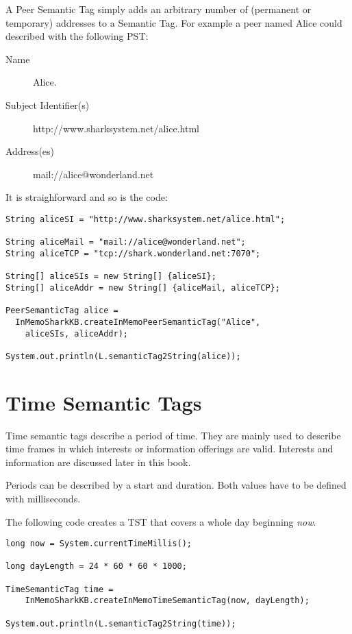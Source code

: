 A Peer Semantic Tag simply adds an arbitrary number of (permanent or temporary) addresses to a Semantic Tag. For example a peer named Alice could described with the following PST: 

\begin{description}
    \item[Name] Alice.
    \item[Subject Identifier(s)] http://www.sharksystem.net/alice.html
    \item[Address(es)] mail://alice@wonderland.net
\end{description}

It is straighforward and so is the code:

\begin{verbatim}
String aliceSI = "http://www.sharksystem.net/alice.html";

String aliceMail = "mail://alice@wonderland.net";
String aliceTCP = "tcp://shark.wonderland.net:7070";

String[] aliceSIs = new String[] {aliceSI};
String[] aliceAddr = new String[] {aliceMail, aliceTCP};

PeerSemanticTag alice = 
  InMemoSharkKB.createInMemoPeerSemanticTag("Alice", 
    aliceSIs, aliceAddr);

System.out.println(L.semanticTag2String(alice));
\end{verbatim}

\section{Time Semantic Tags}
Time semantic tags describe a period of time. They are mainly used to describe time frames in which interests or information offerings are valid. Interests and information are discussed later in this book.

Periods can be described by a start and duration. Both values have to be defined with milliseconds.

The following code creates a TST that covers a whole day beginning {\it now}.

\begin{verbatim}
long now = System.currentTimeMillis();

long dayLength = 24 * 60 * 60 * 1000; 

TimeSemanticTag time = 
    InMemoSharkKB.createInMemoTimeSemanticTag(now, dayLength);

System.out.println(L.semanticTag2String(time));
\end{verbatim}

